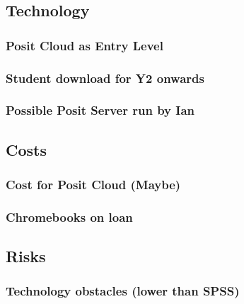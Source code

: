 \documentclass[
  11pt,
  letterpaper,
  oneside,
  open=any]{scrbook}
\begin{document}
\hypertarget{technology}{%
\subsection{Technology}\label{technology}}

\hypertarget{posit-cloud-as-entry-level}{%
\subsubsection{Posit Cloud as Entry
Level}\label{posit-cloud-as-entry-level}}

\hypertarget{student-download-for-y2-onwards}{%
\subsubsection{Student download for Y2
onwards}\label{student-download-for-y2-onwards}}

\hypertarget{possible-posit-server-run-by-ian}{%
\subsubsection{Possible Posit Server run by
Ian}\label{possible-posit-server-run-by-ian}}

\hypertarget{costs}{%
\subsection{Costs}\label{costs}}

\hypertarget{cost-for-posit-cloud-maybe}{%
\subsubsection{Cost for Posit Cloud
(Maybe)}\label{cost-for-posit-cloud-maybe}}

\hypertarget{chromebooks-on-loan}{%
\subsubsection{Chromebooks on loan}\label{chromebooks-on-loan}}

\hypertarget{risks}{%
\subsection{Risks}\label{risks}}

\hypertarget{technology-obstacles-lower-than-spss}{%
\subsubsection{Technology obstacles (lower than
SPSS)}\label{technology-obstacles-lower-than-spss}}
\end{document}
